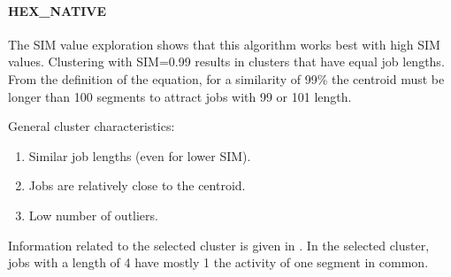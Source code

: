 \documentclass{jhps}
\makeatletter
\newcommand{\jk}[1]{\todo[inline]{JK:\@#1}}
\newcommand{\eb}[1]{\todo[inline, color=GreenYellow]{EB:\@#1}}
\makeatother
\begin{document}
\FloatBarrier
\paragraph{HEX\_NATIVE}
The SIM value exploration shows that this algorithm works best with high SIM values.
Clustering with SIM=0.99 results in clusters that have equal job lengths.
From the definition of the equation, for a similarity of 99\% the centroid must be longer than 100 segments to attract jobs with 99 or 101 length.

General cluster characteristics:
\begin{enumerate}
 \item Similar job lengths (even for lower SIM).
 \item Jobs are relatively close to the centroid.
 \item Low number of outliers.
\end{enumerate}

Information related to the selected cluster is given in .
In the selected cluster, jobs with a length of 4 have mostly 1 the activity of one segment in common.





\end{document}
